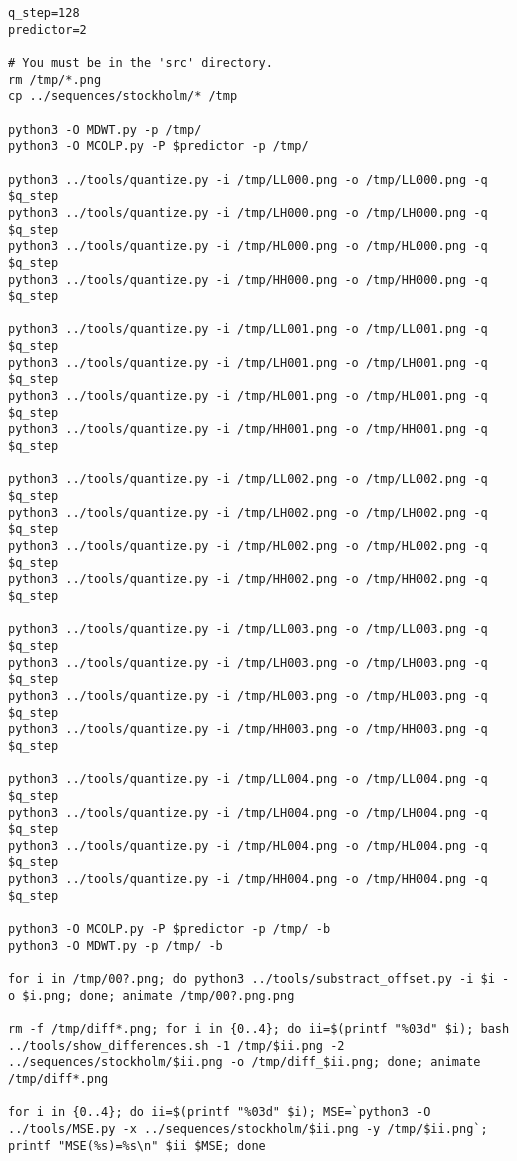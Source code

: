 \begin{verbatim}
q_step=128
predictor=2

# You must be in the 'src' directory.
rm /tmp/*.png
cp ../sequences/stockholm/* /tmp

python3 -O MDWT.py -p /tmp/
python3 -O MCOLP.py -P $predictor -p /tmp/

python3 ../tools/quantize.py -i /tmp/LL000.png -o /tmp/LL000.png -q $q_step
python3 ../tools/quantize.py -i /tmp/LH000.png -o /tmp/LH000.png -q $q_step
python3 ../tools/quantize.py -i /tmp/HL000.png -o /tmp/HL000.png -q $q_step
python3 ../tools/quantize.py -i /tmp/HH000.png -o /tmp/HH000.png -q $q_step

python3 ../tools/quantize.py -i /tmp/LL001.png -o /tmp/LL001.png -q $q_step
python3 ../tools/quantize.py -i /tmp/LH001.png -o /tmp/LH001.png -q $q_step
python3 ../tools/quantize.py -i /tmp/HL001.png -o /tmp/HL001.png -q $q_step
python3 ../tools/quantize.py -i /tmp/HH001.png -o /tmp/HH001.png -q $q_step

python3 ../tools/quantize.py -i /tmp/LL002.png -o /tmp/LL002.png -q $q_step
python3 ../tools/quantize.py -i /tmp/LH002.png -o /tmp/LH002.png -q $q_step
python3 ../tools/quantize.py -i /tmp/HL002.png -o /tmp/HL002.png -q $q_step
python3 ../tools/quantize.py -i /tmp/HH002.png -o /tmp/HH002.png -q $q_step

python3 ../tools/quantize.py -i /tmp/LL003.png -o /tmp/LL003.png -q $q_step
python3 ../tools/quantize.py -i /tmp/LH003.png -o /tmp/LH003.png -q $q_step
python3 ../tools/quantize.py -i /tmp/HL003.png -o /tmp/HL003.png -q $q_step
python3 ../tools/quantize.py -i /tmp/HH003.png -o /tmp/HH003.png -q $q_step

python3 ../tools/quantize.py -i /tmp/LL004.png -o /tmp/LL004.png -q $q_step
python3 ../tools/quantize.py -i /tmp/LH004.png -o /tmp/LH004.png -q $q_step
python3 ../tools/quantize.py -i /tmp/HL004.png -o /tmp/HL004.png -q $q_step
python3 ../tools/quantize.py -i /tmp/HH004.png -o /tmp/HH004.png -q $q_step

python3 -O MCOLP.py -P $predictor -p /tmp/ -b
python3 -O MDWT.py -p /tmp/ -b 

for i in /tmp/00?.png; do python3 ../tools/substract_offset.py -i $i -o $i.png; done; animate /tmp/00?.png.png

rm -f /tmp/diff*.png; for i in {0..4}; do ii=$(printf "%03d" $i); bash ../tools/show_differences.sh -1 /tmp/$ii.png -2 ../sequences/stockholm/$ii.png -o /tmp/diff_$ii.png; done; animate /tmp/diff*.png

for i in {0..4}; do ii=$(printf "%03d" $i); MSE=`python3 -O ../tools/MSE.py -x ../sequences/stockholm/$ii.png -y /tmp/$ii.png`; printf "MSE(%s)=%s\n" $ii $MSE; done
\end{verbatim}

